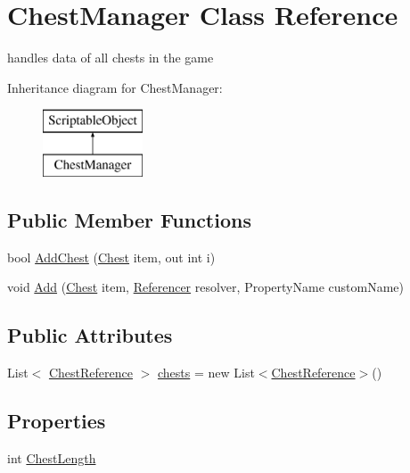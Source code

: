 \hypertarget{class_chest_manager}{}\section{Chest\+Manager Class Reference}
\label{class_chest_manager}


handles data of all chests in the game  


Inheritance diagram for Chest\+Manager\+:\begin{figure}[H]
\begin{center}
\leavevmode
\includegraphics[height=2.000000cm]{class_chest_manager}
\end{center}
\end{figure}
\subsection*{Public Member Functions}
\begin{DoxyCompactItemize}
\item 
bool \mbox{\hyperlink{class_chest_manager_a9f43ad9faa3c78dd3dc6dad738d31878}{Add\+Chest}} (\mbox{\hyperlink{class_chest}{Chest}} item, out int i)
\item 
void \mbox{\hyperlink{class_chest_manager_aaa2d7caf419ad5284a8960b001080794}{Add}} (\mbox{\hyperlink{class_chest}{Chest}} item, \mbox{\hyperlink{class_referencer}{Referencer}} resolver, Property\+Name custom\+Name)
\end{DoxyCompactItemize}
\subsection*{Public Attributes}
\begin{DoxyCompactItemize}
\item 
List$<$ \mbox{\hyperlink{class_chest_reference}{Chest\+Reference}} $>$ \mbox{\hyperlink{class_chest_manager_a6276ab915d10fdc1d93d715718a72aa4}{chests}} = new List$<$\mbox{\hyperlink{class_chest_reference}{Chest\+Reference}}$>$()
\end{DoxyCompactItemize}
\subsection*{Properties}
\begin{DoxyCompactItemize}
\item 
int \mbox{\hyperlink{class_chest_manager_a44c56882941073c68002b3f6ae02ffec}{Chest\+Length}}
\end{DoxyCompactItemize}


